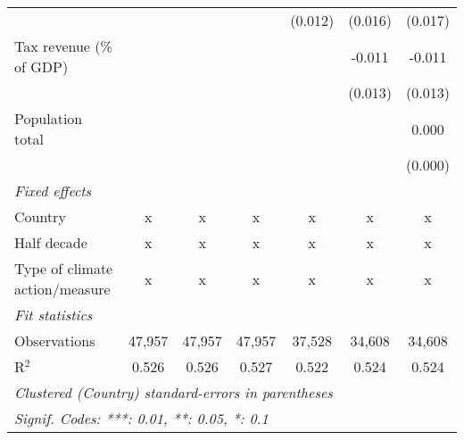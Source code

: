 \begin{tabular}{lcccccc}
                                                             &         &              &               & (0.012)       & (0.016)       & (0.017)\\   
   Tax revenue (\% of GDP)                                   &         &              &               &               & -0.011        & -0.011\\   
                                                             &         &              &               &               & (0.013)       & (0.013)\\   
   Population total                                          &         &              &               &               &               & 0.000\\   
                                                             &         &              &               &               &               & (0.000)\\   
   \emph{Fixed effects}\\
   Country                                                   & x       & x            & x             & x             & x             & x\\  
   Half decade                                               & x       & x            & x             & x             & x             & x\\  
   Type of climate action/measure                            & x       & x            & x             & x             & x             & x\\  
   \midrule \emph{Fit statistics}\\
   Observations                                              & 47,957  & 47,957       & 47,957        & 37,528        & 34,608        & 34,608\\  
   R$^2$                                                     & 0.526   & 0.526        & 0.527         & 0.522         & 0.524         & 0.524\\  
   \midrule
   \multicolumn{7}{l}{\emph{Clustered (Country) standard-errors in parentheses}}\\
   \multicolumn{7}{l}{\emph{Signif. Codes: ***: 0.01, **: 0.05, *: 0.1}}\\
\end{tabular}
\par\endgroup


